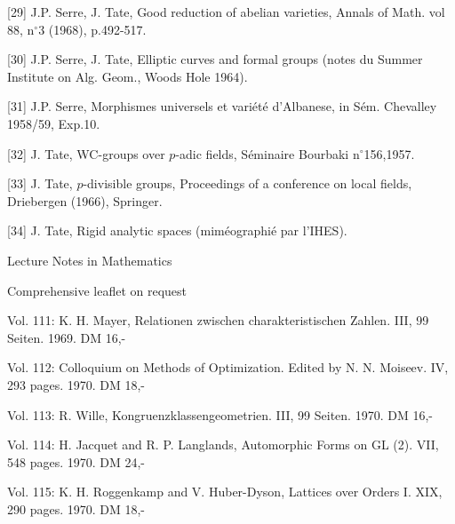{[29]} J.P. Serre, J. Tate, Good reduction of abelian varieties, Annals of Math. vol 88, n$^{\circ}$3 (1968), p.492-517.

{[30]} J.P. Serre, J. Tate, Elliptic curves and formal groups (notes du Summer Institute on Alg. Geom., Woods Hole 1964).

{[31]} J.P. Serre, Morphismes universels et variété d'Albanese, in Sém. Chevalley 1958/59, Exp.10.

{[32]} J. Tate, WC-groups over $p$-adic fields, Séminaire Bourbaki n$^{\circ}$156,1957.

{[33]} J. Tate, $p$-divisible groups, Proceedings of a conference on local fields, Driebergen (1966), Springer.

{[34]} J. Tate, Rigid analytic spaces (miméographié par l'IHES).







Lecture Notes in Mathematics


Comprehensive leaflet on request

Vol. 111: K. H. Mayer, Relationen zwischen charakteristischen Zahlen. III, 99 Seiten. 1969. DM 16,-

Vol. 112: Colloquium on Methods of Optimization. Edited by N. N. Moiseev. IV, 293 pages. 1970. DM 18,-

Vol. 113: R. Wille, Kongruenzklassengeometrien. III, 99 Seiten. 1970. DM 16,-

Vol. 114: H. Jacquet and R. P. Langlands, Automorphic Forms on GL (2). VII, 548 pages. 1970. DM 24,-

Vol. 115: K. H. Roggenkamp and V. Huber-Dyson, Lattices over Orders I. XIX, 290 pages. 1970. DM 18,-

